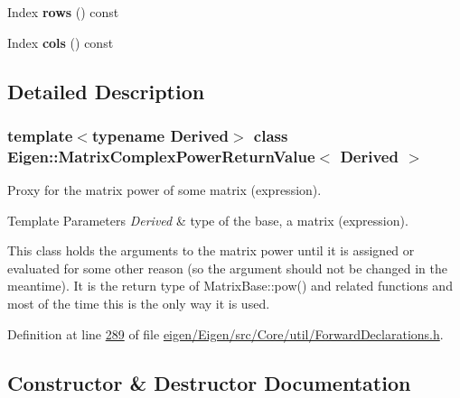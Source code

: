 \begin{DoxyCompactItemize}
\mbox{\label{class_eigen_1_1_matrix_complex_power_return_value_ad64216fcb7130adeccb5301054c0b8fc}} 
Index {\bfseries rows} () const
\item 
\mbox{\label{class_eigen_1_1_matrix_complex_power_return_value_a41bccc801f588f3312b002ee4b03833e}} 
Index {\bfseries cols} () const
\end{DoxyCompactItemize}


\subsection{Detailed Description}
\subsubsection*{template$<$typename Derived$>$\newline
class Eigen\+::\+Matrix\+Complex\+Power\+Return\+Value$<$ Derived $>$}

Proxy for the matrix power of some matrix (expression). 


\begin{DoxyTemplParams}{Template Parameters}
{\em Derived} & type of the base, a matrix (expression).\\
\hline
\end{DoxyTemplParams}
This class holds the arguments to the matrix power until it is assigned or evaluated for some other reason (so the argument should not be changed in the meantime). It is the return type of Matrix\+Base\+::pow() and related functions and most of the time this is the only way it is used. 

Definition at line \hyperlink{eigen_2_eigen_2src_2_core_2util_2_forward_declarations_8h_source_l00289}{289} of file \hyperlink{eigen_2_eigen_2src_2_core_2util_2_forward_declarations_8h_source}{eigen/\+Eigen/src/\+Core/util/\+Forward\+Declarations.\+h}.



\subsection{Constructor \& Destructor Documentation}
\mbox{\label{class_eigen_1_1_matrix_complex_power_return_value_a3e5903e22f70e9deb07c3967ae52fd54}} 
